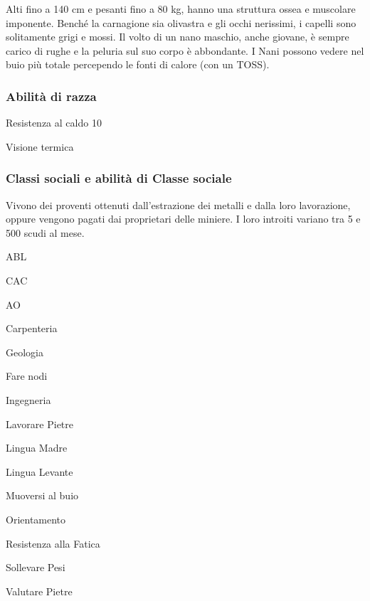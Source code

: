 
\Fisico Alti fino a 140 cm e pesanti
fino a 80 kg, hanno una struttura ossea e muscolare imponente. Bench\'e
la carnagione sia olivastra e gli occhi nerissimi, i capelli sono
solitamente grigi e mossi. Il volto di un nano maschio, anche giovane,
\`e sempre carico di rughe e la peluria sul suo corpo \`e
abbondante.  I Nani possono vedere nel buio pi\`u totale percependo
le fonti di calore (con un TOSS). 


\minmaxnani

\subsubsection{Abilit\`a di razza}
\begin{abilist}
\item Resistenza al caldo 10
\item Visione termica
\end{abilist}

\subsubsection{Classi sociali e abilit\`a di Classe sociale}


 Vivono dei proventi ottenuti dall'estrazione dei metalli
e dalla loro lavorazione, oppure vengono pagati dai proprietari delle
miniere. I loro introiti variano tra 5 e 500 scudi al mese.

\begin{abilist}
\item ABL
\item CAC
\item AO
\item Carpenteria
\item Geologia
\item Fare nodi
\item Ingegneria
\item Lavorare Pietre
\item Lingua Madre
\item Lingua Levante
\item Muoversi al buio
\item Orientamento
\item Resistenza alla Fatica
\item Sollevare Pesi
\item Valutare Pietre
\end{abilist}

